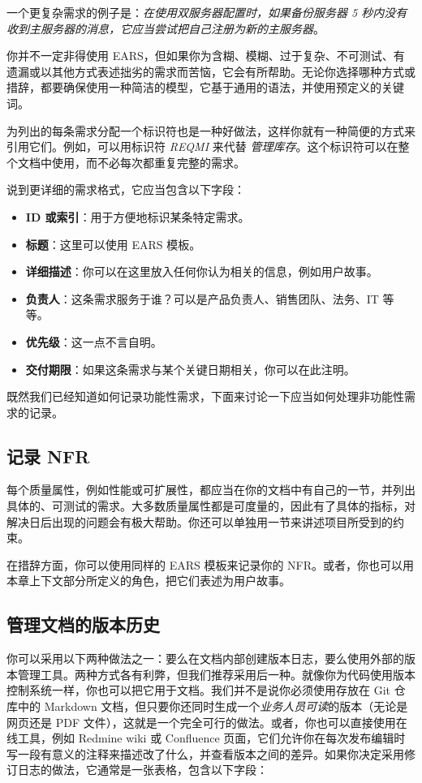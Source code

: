 一个更复杂需求的例子是：\emph{在使用双服务器配置时，如果备份服务器 5 秒内没有收到主服务器的消息，它应当尝试把自己注册为新的主服务器}。

你并不一定非得使用 EARS，但如果你为含糊、模糊、过于复杂、不可测试、有遗漏或以其他方式表述拙劣的需求而苦恼，它会有所帮助。无论你选择哪种方式或措辞，都要确保使用一种简洁的模型，它基于通用的语法，并使用预定义的关键词。

\label{idx:175}
为列出的每条需求分配一个标识符也是一种好做法，这样你就有一种简便的方式来引用它们。例如，可以用标识符 \emph{REQMI} 来代替 \emph{管理库存}。这个标识符可以在整个文档中使用，而不必每次都重复完整的需求。

说到更详细的需求格式，它应当包含以下字段：

\begin{itemize}
\item \textbf{ID 或索引}：用于方便地标识某条特定需求。
\item \textbf{标题}：这里可以使用 EARS 模板。
\item \textbf{详细描述}：你可以在这里放入任何你认为相关的信息，例如用户故事。
\item \textbf{负责人}：这条需求服务于谁？可以是产品负责人、销售团队、法务、IT 等等。
\item \textbf{优先级}：这一点不言自明。
\item \textbf{交付期限}：如果这条需求与某个关键日期相关，你可以在此注明。
\end{itemize}

既然我们已经知道如何记录功能性需求，下面来讨论一下应当如何处理非功能性需求的记录。

\subsection{记录 NFR}

\label{idx:176}
每个质量属性，例如性能或可扩展性，都应当在你的文档中有自己的一节，并列出具体的、可测试的需求。大多数质量属性都是可度量的，因此有了具体的指标，对解决日后出现的问题会有极大帮助。你还可以单独用一节来讲述项目所受到的约束。

在措辞方面，你可以使用同样的 EARS 模板来记录你的 NFR。或者，你也可以用本章上下文部分所定义的角色，把它们表述为用户故事。

\subsection{管理文档的版本历史}

\label{idx:177}
你可以采用以下两种做法之一：要么在文档内部创建版本日志，要么使用外部的版本管理工具。两种方式各有利弊，但我们推荐采用后一种。就像你为代码使用版本控制系统一样，你也可以把它用于文档。我们并不是说你必须使用存放在 Git 仓库中的 Markdown 文档，但只要你还同时生成一个\emph{业务人员可读}的版本（无论是网页还是 PDF 文件），这就是一个完全可行的做法。或者，你也可以直接使用在线工具，例如 Redmine wiki 或 Confluence 页面，它们允许你在每次发布编辑时写一段有意义的注释来描述改了什么，并查看版本之间的差异。如果你决定采用修订日志的做法，它通常是一张表格，包含以下字段：

